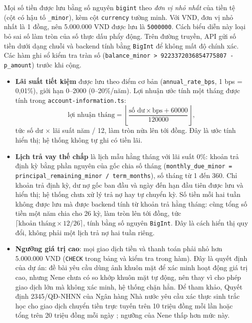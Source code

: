 Mọi số tiền được lưu bằng số nguyên \texttt{bigint} theo \emph{đơn vị nhỏ nhất} của tiền tệ (cột có hậu tố \texttt{\_\allowbreak{}minor}), kèm cột \texttt{currency} tường minh. Với VND, đơn vị nhỏ nhất là 1 đồng, nên 5.000.000 VND được lưu là \texttt{5000000}. Cách biểu diễn này loại bỏ sai số làm tròn của số thực dấu phẩy động. Trên đường truyền, API gửi số tiền dưới dạng chuỗi và backend tính bằng \texttt{BigInt} để không mất độ chính xác. Các hàm ghi sổ kiểm tra tràn số (\texttt{balance\_\allowbreak{}minor > 9223372036854775807 - p\_\allowbreak{}amount}) trước khi cộng.
\begin{itemize}
  \item \textbf{Lãi suất tiết kiệm} được lưu theo điểm cơ bản (\texttt{annual\_\allowbreak{}rate\_\allowbreak{}bps}, 1 bps = 0,01\%), giới hạn 0--2000 (0--20\%/năm). Lợi nhuận ước tính một tháng được tính trong \texttt{account-\allowbreak{}information.\allowbreak{}ts}:
  \[
    \text{lợi nhuận tháng} = \left\lfloor \frac{\text{số dư} \times \text{bps} + 60000}{120000} \right\rfloor,
  \]
  tức số dư $\times$ lãi suất năm / 12, làm tròn nửa lên tới đồng. Đây là ước tính hiển thị; hệ thống không tự ghi có tiền lãi.
  \item \textbf{Lịch trả vay thế chấp} là lịch mẫu hằng tháng với lãi suất 0\%: khoản trả định kỳ bằng phần nguyên của gốc chia số tháng (\texttt{monthly\_\allowbreak{}due\_\allowbreak{}minor = principal\_\allowbreak{}remaining\_\allowbreak{}minor / term\_\allowbreak{}months}), số tháng từ 1 đến 360. Chỉ khoản trả định kỳ, dư nợ gốc ban đầu và ngày đến hạn đầu tiên được lưu và hiển thị; hệ thống chưa xử lý trả nợ hay tự chuyển kỳ. Số tiền mỗi hai tuần không được lưu mà được backend tính từ khoản trả hằng tháng: cùng tổng số tiền một năm chia cho 26 kỳ, làm tròn lên tới đồng, tức $\lceil \text{khoản tháng} \times 12 / 26 \rceil$, tính bằng số nguyên \texttt{BigInt}. Đây là cách hiển thị quy đổi, không phải một lịch trả nợ hai tuần riêng.
  \item \textbf{Ngưỡng giá trị cao}: mọi giao dịch tiền và thanh toán phải nhỏ hơn 5.000.000 VND (\texttt{CHECK} trong bảng và kiểm tra trong hàm). Đây là quyết định của dự án: đề bài yêu cầu dùng ảnh khuôn mặt để xác minh hoạt động giá trị cao, nhưng Nene chưa có so khớp khuôn mặt tự động, nên thay vì cho phép giao dịch lớn mà không xác minh, hệ thống chặn hẳn. Để tham khảo, Quyết định 2345/QĐ-NHNN của Ngân hàng Nhà nước yêu cầu xác thực sinh trắc học cho giao dịch chuyển tiền trực tuyến trên 10 triệu đồng mỗi lần hoặc tổng trên 20 triệu đồng mỗi ngày \parencite{ch5-sbv2345}; ngưỡng của Nene thấp hơn mức này.
\end{itemize}

